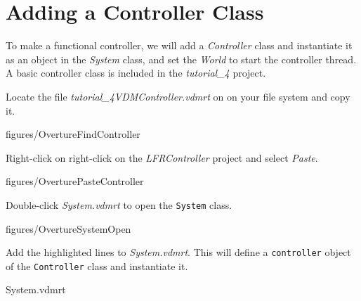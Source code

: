 \documentclass[11pt,a4paper]{../tutorial}
\begin{document}
\newpage
\section{Adding a Controller Class}

To make a functional controller, we will add a \emph{Controller} class and instantiate it as an object in the \emph{System} class, and set the \emph{World} to start the controller thread. A basic controller class is included in the \emph{tutorial\_4} project.

\begin{instructions}
\item Locate the file \emph{tutorial\_4\pathsep{}VDM\pathsep{}Controller.vdmrt} on on your file system and copy it.

    \begin{annotation}[width=0.8\linewidth]{figures/OvertureFindController}
    \end{annotation}

\item Right-click on right-click on the \emph{LFRController} project and select \emph{Paste}.

    \begin{annotation}[width=0.99\linewidth,trim=0 335 0 0,clip]{figures/OverturePasteController}
    \end{annotation}

\item Double-click \emph{System.vdmrt} to open the \texttt{System} class.

    \begin{annotation}[width=0.98\linewidth,trim=0 335 0 0,clip]{figures/OvertureSystemOpen}
    \end{annotation}

\newpage
\item \label{step:system} Add the highlighted lines to \emph{System.vdmrt}. This will define a \texttt{controller} object of the \texttt{Controller} class and instantiate it.

    \bigskip
    
    {System.vdmrt}


\end{instructions}
\end{document}
